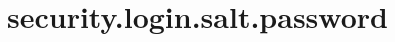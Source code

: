 \section{security.login.salt.password}
\label{configuration:SecurityLoginSaltPassword}
\AvailableInJavaOnly{\TODO}